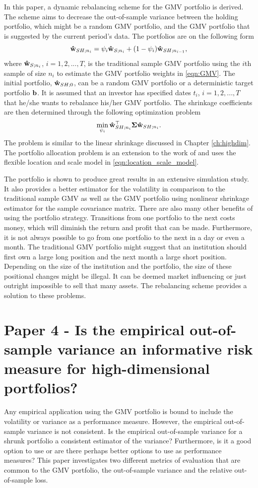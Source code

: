 \documentclass[12pt, oneside]{book}\usepackage{knitr}
\begin{document}
In this paper, a dynamic rebalancing scheme for the GMV portfolio is derived. 
The scheme aims to decrease the out-of-sample variance between the holding portfolio, which might be a random GMV portfolio, and the GMV portfolio that is suggested by the current period's data. 
The portfolios are on the following form
\begin{equation}
  \mathbf{\hat{w}}_{SH;n_{i}}=\psi_{i}\mathbf{\hat{w}}_{S;n_i}+ (1-\psi_{i})\mathbf{\hat{w}}_{SH;n_{i-1}},
\end{equation}
where $\mathbf{\hat{w}}_{S;n_i}$, $i=1,2,...,T$, is the traditional sample GMV portfolio using the $i$th sample of size $n_i$ to estimate the GMV portfolio weights in \eqref{eqn:GMV}. 
The initial portfolio, $\mathbf{\hat{w}}_{SH;0}$, can be a random GMV portfolio or a deterministic target portfolio $\mathbf{b}$.
It is assumed that an investor has specified dates $t_i$, $i=1,2,...,T$ that he/she wants to rebalance his/her GMV portfolio. 
The shrinkage coefficients are then determined through the following optimization problem
$$
\min_{\psi_i} \mathbf{\hat{w}}_{SH;n_{i}}^\top \mathbf{\Sigma} \mathbf{\hat{w}}_{SH;n_{i}}.
$$
The problem is similar to the linear shrinkage discussed in Chapter \ref{ch:highdim}.
The portfolio allocation problem is an extension to the work of \citet{bodnar2018estimation} and uses the flexible location and scale model in \eqref{eqn:location_scale_model}.

The portfolio is shown to produce great results in an extensive simulation study.
It also provides a better estimator for the volatility in comparison to the traditional sample GMV as well as the GMV portfolio using \citet{lw20} nonlinear shrinkage estimator for the sample covariance matrix.
There are also many other benefits of using the portfolio strategy.
Transitions from one portfolio to the next costs money, which will diminish the return and profit that can be made.
Furthermore, it is not always possible to go from one portfolio to the next in a day or even a month.
The traditional GMV portfolio might suggest that an institution should first own a large long position and the next month a large short position.
Depending on the size of the institution and the portfolio, the size of these positional changes might be illegal. 
It can be deemed market influencing or just outright impossible to sell that many assets.
The rebalancing scheme provides a solution to these problems.

\section{Paper 4 - Is the empirical out-of-sample variance an informative risk measure for high-dimensional portfolios?}\label{sec:paper4}
Any empirical application using the GMV portfolio is bound to include the volatility or variance as a performance measure. 
However, the empirical out-of-sample variance is not consistent.
Is the empirical out-of-sample variance for a shrunk portfolio a consistent estimator of the variance? 
Furthermore, is it a good option to use or are there perhaps better options to use as performance measures? 
This paper investigates two different metrics of evaluation that are common to the GMV portfolio, the out-of-sample variance and the relative out-of-sample loss.
\end{document}
